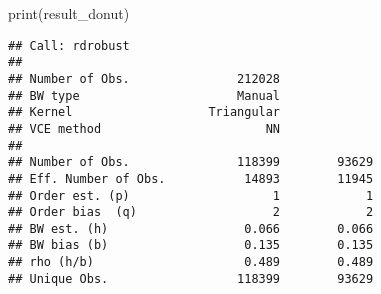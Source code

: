 \documentclass[
]{article}
\newenvironment{Shaded}{\begin{snugshade}}{\end{snugshade}}
\newcommand{\FunctionTok}[1]{\textcolor[rgb]{0.00,0.00,0.00}{#1}}
\newcommand{\NormalTok}[1]{#1}
\begin{document}
\begin{Shaded}
\begin{Highlighting}[]
\FunctionTok{print}\NormalTok{(result\_donut)}
\end{Highlighting}
\end{Shaded}

\begin{verbatim}
## Call: rdrobust
## 
## Number of Obs.               212028
## BW type                      Manual
## Kernel                   Triangular
## VCE method                       NN
## 
## Number of Obs.               118399        93629
## Eff. Number of Obs.           14893        11945
## Order est. (p)                    1            1
## Order bias  (q)                   2            2
## BW est. (h)                   0.066        0.066
## BW bias (b)                   0.135        0.135
## rho (h/b)                     0.489        0.489
## Unique Obs.                  118399        93629
\end{verbatim}
\end{document}
